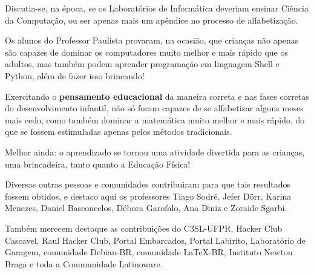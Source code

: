 \begin{multicols}{2}
{Discutia-se, na época, se os Laboratórios de Informática deveriam ensinar Ciência da Computação, ou ser apenas mais um apêndice no processo de alfabetização.

Os alunos do Professor Paulista provaram, na ocasião, que crianças não apenas são capazes de dominar os computadores muito melhor e mais rápido que os adultos, mas também podem aprender programação em linguagem Shell e Python, além de fazer isso brincando!

Exercitando o \textbf{pensamento educacional} da maneira correta e nas fases corretas do desenvolvimento infantil, não só foram capazes de se alfabetizar alguns meses mais cedo, como também dominar a matemática muito melhor e mais rápido, do que se fossem estimuladas apenas pelos métodos tradicionais.

Melhor ainda: o aprendizado se tornou uma atividade divertida para as crianças, uma brincadeira, tanto quanto a Educação Física!

Diversas outras pessoas e comunidades contribuiram para que tais resultados fossem obtidos, e destaco aqui os professores Tiago Sodré, Jefer Dörr, Karina Menezes, Daniel Basconcelos, Débora Garofalo, Ana Diniz e Zoraide Sgarbi.

Também merecem destaque as contribuições do C3SL-UFPR, Hacker Club Cascavel, Raul Hacker Club, Portal Embarcados, Portal Labirito, Laboratório de Garagem, comunidade Debian-BR, comunidade \LaTeX-BR, Instituto Newton Braga e toda a Communidade Latinoware.}
\end{multicols}

\vfill
\pagebreak